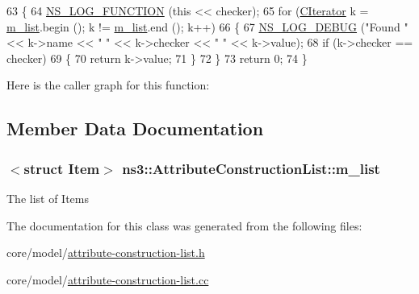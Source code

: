 \begin{DoxyCode}
63 \{
64   \hyperlink{log-macros-disabled_8h_a90b90d5bad1f39cb1b64923ea94c0761}{NS\_LOG\_FUNCTION} (\textcolor{keyword}{this} << checker);
65   \textcolor{keywordflow}{for} (\hyperlink{classns3_1_1AttributeConstructionList_aa1a046c928d9d1870a5f8ab8cb6cf6e9}{CIterator} k = \hyperlink{classns3_1_1AttributeConstructionList_a4c2f4c79b28283ce91431462b9b5a716}{m\_list}.begin (); k != \hyperlink{classns3_1_1AttributeConstructionList_a4c2f4c79b28283ce91431462b9b5a716}{m\_list}.end (); k++)
66     \{
67       \hyperlink{group__logging_ga413f1886406d49f59a6a0a89b77b4d0a}{NS\_LOG\_DEBUG} (\textcolor{stringliteral}{"Found "} << k->name << \textcolor{stringliteral}{" "} << k->checker << \textcolor{stringliteral}{" "} << k->value);
68       \textcolor{keywordflow}{if} (k->checker == checker)
69         \{
70           \textcolor{keywordflow}{return} k->value;
71         \}
72     \}  
73   \textcolor{keywordflow}{return} 0;
74 \}
\end{DoxyCode}


Here is the caller graph for this function\+:




\subsection{Member Data Documentation}
\subsubsection[{\texorpdfstring{m\+\_\+list}{m_list}}]{$<$struct {\bf Item}$>$ ns3\+::\+Attribute\+Construction\+List\+::m\+\_\+list\hspace{0.3cm}{\ttfamily [private]}}\hypertarget{classns3_1_1AttributeConstructionList_a4c2f4c79b28283ce91431462b9b5a716}{}\label{classns3_1_1AttributeConstructionList_a4c2f4c79b28283ce91431462b9b5a716}
The list of Items 

The documentation for this class was generated from the following files\+:\begin{DoxyCompactItemize}
\item 
core/model/\hyperlink{attribute-construction-list_8h}{attribute-\/construction-\/list.\+h}\item 
core/model/\hyperlink{attribute-construction-list_8cc}{attribute-\/construction-\/list.\+cc}\end{DoxyCompactItemize}
